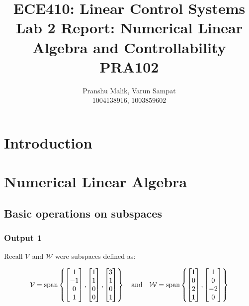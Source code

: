 \documentclass[10pt]{article}
\date{}
\begin{document}
\title{\textbf{\Large{\textsc{ECE410:} Linear Control Systems}} \\ \Large{Lab 2 Report: Numerical Linear Algebra and Controllability} \\ \textbf{\small{PRA102}}\vspace{-0.3cm}}
\author{Pranshu Malik, Varun Sampat \\ \footnotesize{1004138916}, \footnotesize{1003859602}\vspace{-3cm}}

\maketitle

\section{Introduction}

\section{Numerical Linear Algebra}
\subsection{Basic operations on subspaces}
\subsubsection{Output 1}
Recall $ \mathcal{V} $ and $ \mathcal{W} $ were subspaces defined as:

\begin{equation*}
    \mathcal{V} = \text{span}
    \begin{Bmatrix}
        \begin{bmatrix} 1\\-1\\0\\1 \end{bmatrix},
        \begin{bmatrix} 1\\1\\0\\0 \end{bmatrix},
        \begin{bmatrix} 3\\1\\0\\1 \end{bmatrix}
    \end{Bmatrix}
    \quad
    \text{and}
    \quad
    \mathcal{W} = \text{span}
    \begin{Bmatrix}
        \begin{bmatrix} 1\\0\\2\\1 \end{bmatrix},
        \begin{bmatrix} 1\\0\\-2\\0 \end{bmatrix}
    \end{Bmatrix}
\end{equation*}
\end{document}
